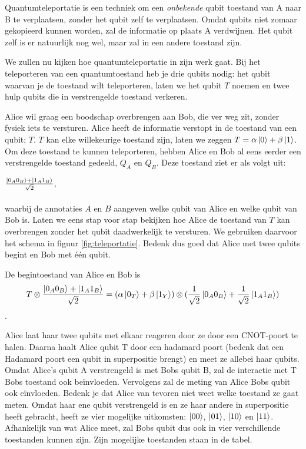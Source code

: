 \documentclass[10pt, a4paper]{article}
\begin{document}
Quantumteleportatie is een techniek om een \emph{onbekende} qubit toestand van A naar B te verplaatsen, zonder het qubit zelf te verplaatsen. Omdat qubits niet zomaar gekopieerd kunnen worden, zal de informatie op plaats A verdwijnen. Het qubit zelf is er natuurlijk nog wel, maar zal in een andere toestand zijn.

We zullen nu kijken hoe quantumteleportatie in zijn werk gaat. Bij het teleporteren van een quantumtoestand heb je drie qubits nodig: het qubit waarvan je de toestand wilt teleporteren, laten we het qubit $T$ noemen en twee hulp qubits die in verstrengelde toestand verkeren.

Alice wil graag een boodschap overbrengen aan Bob, die ver weg zit, zonder fysiek iets te versturen. Alice heeft de informatie verstopt in de toestand van een qubit; $T$. $T$ kan elke willekeurige toestand zijn, laten we zeggen $T=\alpha\ket{0}+\beta\ket{1}$. Om deze toestand te kunnen teleporteren, hebben Alice en Bob al eens eerder een verstrengelde toestand gedeeld, $Q_A$ en $Q_B$. Deze toestand ziet er als volgt uit:

$\frac{\ket{0_A0_B}+\ket{1_A1_B}}{\sqrt{2}}$,\\
\\

waarbij de annotaties $A$ en $B$ aangeven welke qubit van Alice en welke qubit van Bob is. Laten we eens stap voor stap bekijken hoe Alice de toestand van $T$ kan overbrengen zonder het qubit daadwerkelijk te versturen. We gebruiken daarvoor het schema in figuur \ref{fig:teleportatie}. Bedenk dus goed dat Alice met twee qubits begint en Bob met \'{e}\'{e}n qubit.
\iffalse
\begin{figure}[h]
\centering
\texttt{[image: Teleportatie\_figuur]}
\label{fig:teleportatie}
\end{figure}
\fi
De begintoestand van Alice en Bob is
\begin{equation}
T \otimes \frac{\ket{0_A0_B}+\ket{1_A1_B}}{\sqrt{2}}
= 
(\alpha\ket{0_T}+\beta\ket{1_Y}) \otimes (\frac{1}{\sqrt{2}}\ket{0_A0_B}+\frac{1}{\sqrt{2}}\ket{1_A1_B})
\end{equation}.

Alice laat haar twee qubits met elkaar reageren door ze door een CNOT-poort te halen.  Daarna haalt Alice qubit T door een hadamard poort (bedenk dat een Hadamard poort een qubit in superpositie brengt) en meet ze allebei haar qubits. Omdat Alice's qubit A verstrengeld is met Bobs qubit B, zal de interactie met T Bobs toestand ook be\"{i}nvloeden. Vervolgens zal de meting van Alice Bobs qubit ook e\"{i}nvloeden. Bedenk je dat Alice van tevoren niet weet welke toestand ze gaat meten. Omdat haar ene qubit verstrengeld is en ze haar andere in superpositie heeft gebracht, heeft ze vier mogelijke uitkomsten: $\ket{00}$, $\ket{01}$, $\ket{10}$ en $\ket{11}$. Afhankelijk van wat Alice meet, zal Bobs qubit dus ook in vier verschillende toestanden kunnen zijn. Zijn mogelijke toestanden staan in de tabel.
\end{document}
